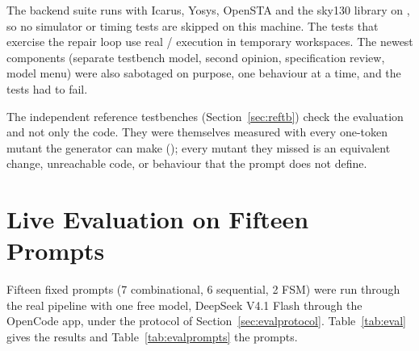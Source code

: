 The backend suite runs with Icarus, Yosys, OpenSTA and the sky130 library on
, so no simulator or timing tests are skipped on this machine. The tests
that exercise the repair loop use real / execution in
temporary workspaces. The newest components (separate testbench model, second
opinion, specification review, model menu) were also sabotaged on purpose, one
behaviour at a time, and the tests had to fail.

The independent reference testbenches (Section~\ref{sec:reftb}) check the evaluation
and not only the code. They were themselves measured with every one-token mutant the
generator can make (); every mutant they
missed is an equivalent change, unreachable code, or behaviour that the prompt does
not define.

\section{Live Evaluation on Fifteen Prompts}
\label{sec:eval}
Fifteen fixed prompts (7 combinational, 6 sequential, 2 FSM) were run through the
real pipeline with one free model, DeepSeek V4.1 Flash through the OpenCode app,
under the protocol of Section~\ref{sec:evalprotocol}. Table~\ref{tab:eval} gives the
results and Table~\ref{tab:evalprompts} the prompts.

